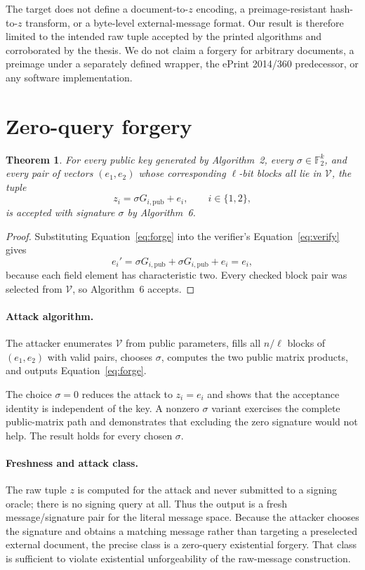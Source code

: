 \documentclass[10pt,a4paper]{article}
\newtheorem{theorem}{Theorem}
\newcommand{\F}{\mathbb{F}}
\newcommand{\VES}{\mathcal{V}}
\begin{document}
The target does not define a document-to-$z$ encoding, a preimage-resistant
hash-to-$z$ transform, or a byte-level external-message format.  Our result is
therefore limited to the intended raw tuple accepted by the printed algorithms
and corroborated by the thesis.  We do not claim a forgery for arbitrary
documents, a preimage under a separately defined wrapper, the ePrint 2014/360
predecessor, or any software implementation.

\section{Zero-query forgery}

\begin{theorem}
For every public key generated by Algorithm~2, every
$\sigma\in\F_2^k$, and every pair of vectors $(e_1,e_2)$ whose corresponding
$\ell$-bit blocks all lie in $\VES$, the tuple
\begin{equation}
 z_i=\sigma G_{i,\mathrm{pub}}+e_i,
 \qquad i\in\{1,2\},
 \label{eq:forge}
\end{equation}
is accepted with signature $\sigma$ by Algorithm~6.
\end{theorem}

\begin{proof}
Substituting Equation~\eqref{eq:forge} into the verifier's
Equation~\eqref{eq:verify} gives
\[
 e_i'=\sigma G_{i,\mathrm{pub}}+
      \sigma G_{i,\mathrm{pub}}+e_i=e_i,
\]
because each field element has characteristic two.  Every checked block pair
was selected from $\VES$, so Algorithm~6 accepts.
\end{proof}

\paragraph{Attack algorithm.}
The attacker enumerates $\VES$ from public parameters, fills all $n/\ell$
blocks of $(e_1,e_2)$ with valid pairs, chooses $\sigma$, computes the two
public matrix products, and outputs Equation~\eqref{eq:forge}.

The choice $\sigma=0$ reduces the attack to $z_i=e_i$ and shows that the
acceptance identity is independent of the key.  A nonzero $\sigma$ variant
exercises the complete public-matrix path and demonstrates that excluding the
zero signature would not help.  The result holds for every chosen $\sigma$.

\paragraph{Freshness and attack class.}
The raw tuple $z$ is computed for the attack and never submitted to a signing
oracle; there is no signing query at all.  Thus the output is a fresh
message/signature pair for the literal message space.  Because the attacker
chooses the signature and obtains a matching message rather than targeting a
preselected external document, the precise class is a zero-query existential
forgery.  That class is sufficient to violate existential unforgeability of
the raw-message construction.
\end{document}
